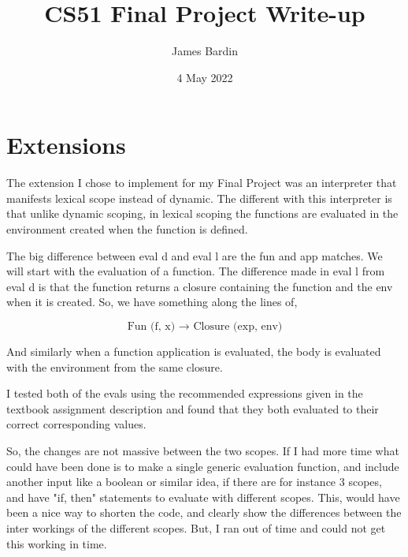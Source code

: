 \documentclass[12pt]{article}
\newcommand{\noin}{\noindent}
\begin{document}
 
\title{CS51 Final Project Write-up}
\author{James Bardin}
\date{4 May 2022}
\maketitle

\bigskip

\section{Extensions}
\noin The extension I chose to implement for my Final Project was an interpreter that manifests lexical scope instead of dynamic. The different with this interpreter is that unlike dynamic scoping, in lexical scoping the functions are evaluated in the environment created when the function is defined. \newline

The big difference between eval d and eval l are the fun and app matches. We will start with the evaluation of a function. The difference made in eval l from eval d is that the function returns a closure containing the function and the env when it is created.  So, we have something along the lines of,

\begin{equation}
    \text{Fun (f, x) $\longrightarrow$ Closure (exp, env)}
\end{equation}

And similarly when a function application is evaluated, the body is evaluated with the environment from the same closure.

I tested both of the evals using the recommended expressions given in the textbook assignment description and found that they both evaluated to their correct corresponding values.

So, the changes are not massive between the two scopes. If I had more time what could have been done is to make a single generic evaluation function, and include another input like a boolean or similar idea, if there are for instance 3 scopes, and have "if, then" statements to evaluate with different scopes. This, would have been a nice way to shorten the code, and clearly show the differences between the inter workings of the different scopes. But, I ran out of time and could not get this working in time. 



 
\end{document}
